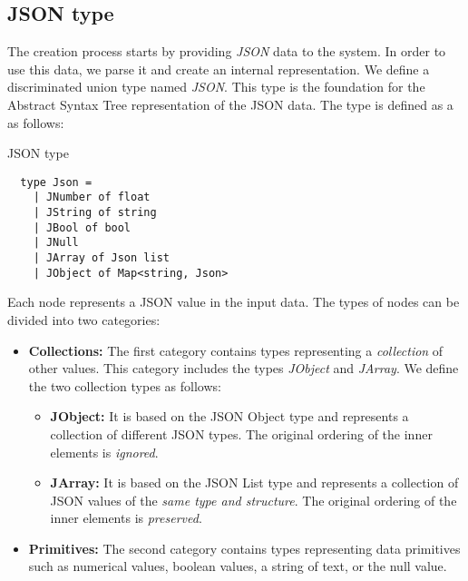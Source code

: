 \subsection{JSON type}
\label{sub:json}
The creation process starts by providing \emph{JSON} data to the system.
In order to use this data, we parse it and create an internal representation.
We define a discriminated union type named \emph{JSON}.
This type is the foundation for the Abstract Syntax Tree representation of the JSON data.
The type is defined as a as follows:
\begin{listing}[H]
	\caption {JSON type}
	\begin{lstlisting}
  type Json =
    | JNumber of float
    | JString of string
    | JBool of bool
    | JNull
    | JArray of Json list
    | JObject of Map<string, Json>
  \end{lstlisting}
\end{listing}

Each node represents a JSON value in the input data.
The types of nodes can be divided into two categories:
\begin{itemize}
	\item {\textbf{Collections:} The first category contains types representing a \emph{collection} of other values. This category includes the types \emph{JObject} and \emph{JArray}.
	      We define the two collection types as follows:
	      \begin{itemize}
		      \item \textbf{JObject:} It is based on the JSON Object type and represents a collection of different JSON types. The original ordering of the inner elements is \emph{ignored}.
		      \item \textbf{JArray:} It is based on the JSON List type and represents a collection of JSON values of the \emph{same type and structure}. The original ordering of the inner elements is \emph{preserved}.
	      \end{itemize}
	      }
	\item \textbf{Primitives:} The second category contains types representing data primitives such as numerical values, boolean values,
	      a string of text, or the null value.
\end{itemize}

